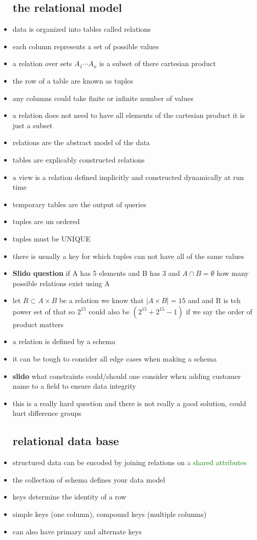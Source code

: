 \documentclass{article}
\begin{document}
\begin{itemize}
\subsection*{the relational model}
\item data is organized into tables called relations
\item each column represents a set of possible values 
\item a relation over sets $A_1\cdots A_n$ is a subset of there cartesian product
\item the row of a table are known as tuples
\item any columns could take finite or infinite number of values
\item a relation does not need to have all elements of the cartesian product it is just a subset 
\item  relations are the abstract model of the data 
\item tables are explicably constructed relations
\item a view is a relation defined implicitly and constructed dynamically at run time 
\item temporary tables are the output of queries
\item tuples are un ordered 
\item tuples must be UNIQUE
\item there is usually a key for which tuples can not have all of the same  values
\item \textbf{Slido question} if A has 5 elements and B has 3 and $A\cap B = \emptyset$ how many possible relations exist using A 
\item let $R\subset A\times B$  be a relation we know that $|A\times B|=15$ and and R is teh power set of that so $2^{15}$ could also be $(2^{15}+2^{15}-1)$ if we say the order of product matters
\item a relation is defined by a schema 
\item it can be tough to consider all edge cases when making a schema
\item \textbf{slido} what constraints could/should one consider when adding customer name to a field to ensure data integrity
\item this is a really hard question and there is not really a good solution, could hurt difference groups 
\subsection*{relational data base}
\item structured data can be encoded by joining relations on \textcolor{green}{a shared attributes}
\item the collection of schema defines your data model 
\item keys determine the identity of a row 
\item simple keys (one column), compound keys (multiple columns)
\item can also have primary and alternate keys

\end{itemize}
\end{document}
